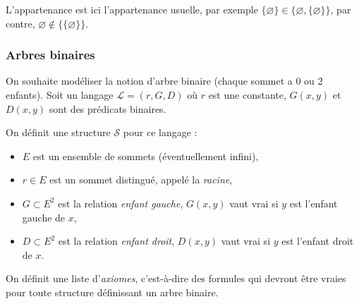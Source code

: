 \documentclass[11pt,class=report,crop=false]{standalone}
\begin{document}
L'appartenance est ici l'appartenance usuelle, par exemple $\{ \varnothing \} \in \{ \varnothing, \{ \varnothing \}\}$, par contre, $\varnothing \notin \{\{ \varnothing \}\}$.


\subsubsection{Arbres binaires}

On souhaite modéliser la notion d'arbre binaire (chaque sommet a $0$ ou $2$ enfants).
Soit un langage $\mathcal{L} = (r, G, D)$ où $r$ est une constante, $G(x,y)$ et $D(x,y)$ sont des prédicats binaires.

\medskip

On définit une structure $\mathcal{S}$ pour ce langage :
\begin{itemize}
	\item $E$ est un ensemble de sommets (éventuellement infini),
	\item $r \in E$ est un sommet distingué, appelé la \emph{racine},
	\item $G \subset E^2$ est la relation \emph{enfant gauche}, $G(x,y)$ vaut vrai si $y$ est l'enfant gauche de $x$,
	\item $D \subset E^2$ est la relation \emph{enfant droit}, $D(x,y)$ vaut vrai si $y$ est l'enfant droit de $x$.
\end{itemize}





On définit une liste d'\emph{axiomes}, c'est-à-dire des formules qui devront être vraies pour toute structure définissant un arbre binaire.
\end{document}
